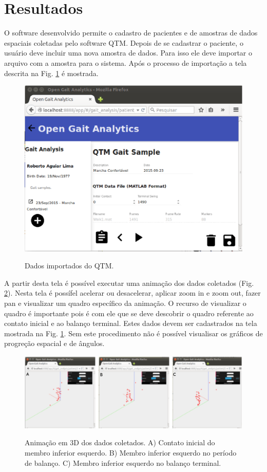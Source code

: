 \documentclass[journal]{IEEEtran}
\begin{document}
\section{Resultados}
O software desenvolvido permite o cadastro de pacientes e de amostras de dados espaciais
coletadas pelo software QTM. 
Depois de se cadastrar o paciente, o usuário deve incluir uma nova amostra de dados.
Para isso ele deve importar o arquivo com a amostra para o sistema. Após o processo de 
importação a tela descrita na Fig. \ref{qtm_data} é mostrada.

\begin{figure}[tb]
	\centering
	{\includegraphics[width=\textwidth]{tela7}}
	\caption{Dados importados do QTM. }
	\label{qtm_data}
\end{figure}


A partir desta tela é possível executar uma animação dos dados coletados (Fig. \ref{animacao}).
Nesta tela é possífel acelerar ou desacelerar, aplicar zoom in e zoom out, fazer pan e visualizar
um quadro específico da animação. O recurso de visualizar o quadro é importante pois é com ele
que se deve descobrir o quadro referente ao contato inicial e ao balanço terminal. Estes
dados devem ser cadastrados na tela mostrada na Fig. \ref{qtm_data}. Sem este procedimento não
é possível visualisar os gráficos de progreção espacial e de ângulos.

\begin{figure}[tb]
	\centering
	{\includegraphics[width=\textwidth]{animacao}}
	\caption{Animação em 3D dos dados coletados. A) Contato inicial
		do membro inferior esquerdo. B) Membro inferior esquerdo no
	período de balanço. C) Membro inferior esquerdo no balanço terminal. }
	\label{animacao}
\end{figure}
\end{document}
